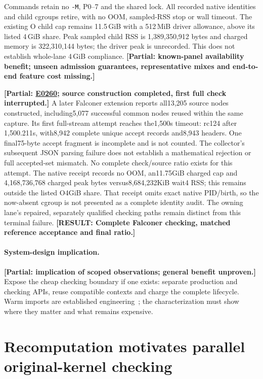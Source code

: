 \documentclass[10pt,twocolumn]{article}
\newcommand{\missing}[1]{\textbf{[RESULT: #1]}}
\newcommand{\partialev}[1]{\textbf{[Partial: #1]}}
\newcommand{\expref}[2]{\href{https://github.com/yunwei37/proofserve/blob/main/docs/tmp/build-and-evaluate/step-#1/step-report.md}{E#2}}
\begin{document}
Commands retain no \texttt{-M}, P0--7 and the shared lock. All recorded native
identities and child cgroups retire, with no OOM, sampled-RSS stop or wall timeout.
The existing O child cap remains 11.5\,GiB with a 512\,MiB driver allowance,
above its listed 4\,GiB share. Peak sampled child RSS is 1,389,350,912 bytes
and charged memory is 322,310,144 bytes; the driver peak is unrecorded.
This does not establish whole-lane 4\,GiB compliance.
\partialev{known-panel availability benefit; unseen admission guarantees,
representative mixes and end-to-end feature cost missing.}


\partialev{\expref{0260-20261102T020415+0000}{0260}; source construction completed, first full check interrupted.}
A later Falconer extension reports all13,205 source nodes constructed,
including5,077 successful common nodes reused within the same capture.
Its first full-stream attempt reaches the1,500s timeout: rc124 after
1,500.211s, with8,942 complete unique accept records and8,943 headers.
One final75-byte accept fragment is incomplete and is not counted.
The collector's subsequent JSON parsing failure does not establish a
mathematical rejection or full accepted-set mismatch.
No complete check/source ratio exists for this attempt.
The native receipt records no OOM, an11.75GiB charged cap and
4,168,736,768 charged peak bytes versus8,684,232KiB wait4 RSS;
this remains outside the listed O4GiB share.
That receipt omits exact native PID/birth, so the now-absent cgroup is
not presented as a complete identity audit.
The owning lane's repaired, separately qualified checking paths remain
distinct from this terminal failure.
\missing{Complete Falconer checking, matched reference acceptance and final ratio.}

\paragraph{System-design implication.}
\partialev{implication of scoped observations; general benefit unproven.}
Expose the cheap checking boundary if one exists: separate production and
checking APIs, reuse compatible contexts and charge the complete lifecycle.
Warm imports are established engineering~\cite{kimina,kiminaPaper};
the characterization must show where they matter and what remains expensive.

\section{Recomputation motivates parallel original-kernel checking}
\label{sec:chunked}
\end{document}
